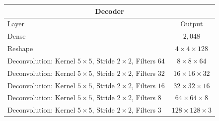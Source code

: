 \begin{center}
    \begin{table}[H]
        \centering
        \begin{tabular}{ | l | c | }
            \multicolumn{2}{c}{Decoder} \\ \hline
            Layer & Output\\ \hline
            Dense                                                                   & $2,048$                   \\
            Reshape                                                                 & $4\times 4\times    128$  \\
            Deconvolution: Kernel $5\times5$, Stride $2\times2$, Filters $64 $      & $8\times 8\times    64 $  \\
            Deconvolution: Kernel $5\times5$, Stride $2\times2$, Filters $32 $      & $16\times 16\times  32 $  \\
            Deconvolution: Kernel $5\times5$, Stride $2\times2$, Filters $16 $      & $32\times 32\times  16 $  \\
            Deconvolution: Kernel $5\times5$, Stride $2\times2$, Filters $8  $      & $64\times 64\times  8  $  \\
            Deconvolution: Kernel $5\times5$, Stride $2\times2$, Filters $3  $      & $128\times 128\times3  $  \\
            \hline
        \end{tabular} 
    \end{table}
\end{center}

\vspace{-3em}

